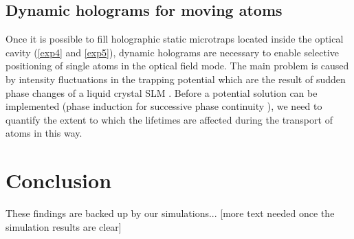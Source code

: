 \documentclass[../Thesis-IJspeert.tex]{subfiles}
\begin{document}
\subsection{Dynamic holograms for moving atoms}
\label{exp3}
Once it is possible to fill holographic static microtraps located inside the optical cavity (\autoref{exp4} and \autoref{exp5}), dynamic holograms are necessary to enable selective positioning of single atoms in the optical field mode. The main problem is caused by intensity fluctuations in the trapping potential which are the result of sudden phase changes of a liquid crystal SLM \cite{McGloin2003}. Before a potential solution can be implemented (phase induction for successive phase continuity \cite{Kim2019}), we need to quantify the extent to which the lifetimes are affected during the transport of atoms in this way.



\section{Conclusion}


These findings are backed up by our simulations... [more text needed once the simulation results are clear]



\iffalse
For a single dipole trap such an active feedback is straightforward to implement, using an AOM to change the trapping light power as has been done here. To selectively lower the depth of individual traps within a larger array presents a further challenge. In this case the approach would be to utilise an SLM to control the relative power at each trapping site independently. The standard iterative phase-retrieval algorithms are capable of creating multiple traps of differing depths, and a ``power dump" site could be used to fix the absolute powers of the traps. One hurdle to be overcome would be that these iterative algorithms exploit phase freedom in the plane in which the traps are formed. Phase jumps at the trapping site when lowering the trap depths would be expected to disturb the trapped single atoms and lead to higher loss rates on switching depths. 
\fi
\end{document}
